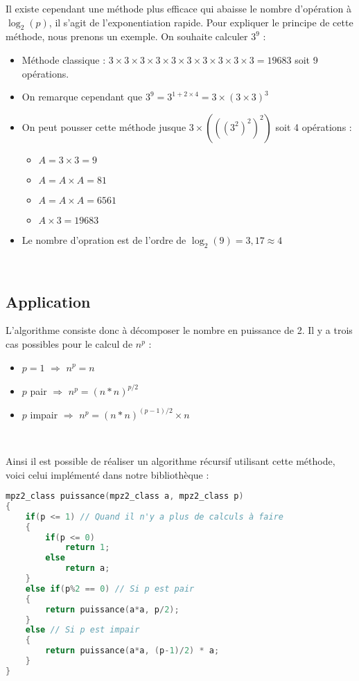 Il existe cependant une méthode plus efficace qui abaisse le nombre d’opération à $\log_2(p)$, il s’agit de l’exponentiation rapide. Pour expliquer le principe de cette méthode, nous prenons un exemple. On souhaite calculer $3^9$ :
\begin{itemize}
	\item Méthode classique : $3\times 3\times 3\times 3\times 3\times 3\times 3\times 3\times 3\times 3=19683$ soit 9 opérations.
	\item On remarque cependant que $3^9=3^{1+2\times4}=3\times(3\times3)^3$
	\item On peut pousser cette méthode jusque $3\times\left(\left(\left(3^2\right)^2\right)^2\right)$ soit 4 opérations :
	\begin{itemize}
		\item $A=3\times3 = 9$
		\item $A=A\times A = 81$
		\item $A=A\times A = 6561$
		\item $A\times3 = 19683$
	\end{itemize}
	\item Le nombre d'opration est de l'ordre de $\log_2(9)=3,17\approx 4$
\end{itemize} \ \\


\subsection{Application}
L’algorithme consiste donc à décomposer le nombre en puissance de 2. Il y a trois cas possibles pour le calcul de $n^p$ :

\begin{itemize}
	\item $p=1$ $\Rightarrow$ $n^p=n$
	\item $p$ pair $\Rightarrow$ $n^p=(n*n)^{p/2}$
	\item $p$ impair $\Rightarrow$ $n^p=(n*n)^{(p-1)/2} \times n$
\end{itemize} \ 

Ainsi il est possible de réaliser un algorithme récursif utilisant cette méthode, voici celui implémenté dans notre bibliothèque :

\begin{lstlisting}[language=C++]
mpz2_class puissance(mpz2_class a, mpz2_class p)
{
    if(p <= 1) // Quand il n'y a plus de calculs à faire
    {
        if(p <= 0)
            return 1;
        else
            return a;
    }
    else if(p%2 == 0) // Si p est pair
    {
        return puissance(a*a, p/2);
    }
    else // Si p est impair
    {
        return puissance(a*a, (p-1)/2) * a;
    }
}
\end{lstlisting}

